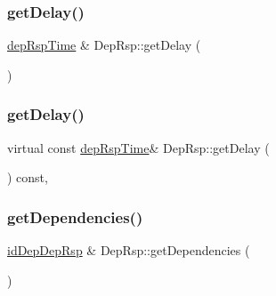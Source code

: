 \mbox{\label{classDepRsp_a89f0b26c269083713702386392f82c45}} 
\subsubsection{\texorpdfstring{get\+Delay()}{getDelay()}\hspace{0.1cm}{\footnotesize\ttfamily [1/2]}}
{\footnotesize\ttfamily \hyperlink{depRsp__m_8h_ab118b8474723cf26f98151aae3d55940}{dep\+Rsp\+Time} \& Dep\+Rsp\+::get\+Delay (\begin{DoxyParamCaption}{ }\end{DoxyParamCaption})\hspace{0.3cm}{\ttfamily [virtual]}}

\mbox{\label{classDepRsp_a8badf32e7f81c0ec7a9b4eb22fb83c0a}} 
\subsubsection{\texorpdfstring{get\+Delay()}{getDelay()}\hspace{0.1cm}{\footnotesize\ttfamily [2/2]}}
{\footnotesize\ttfamily virtual const \hyperlink{depRsp__m_8h_ab118b8474723cf26f98151aae3d55940}{dep\+Rsp\+Time}\& Dep\+Rsp\+::get\+Delay (\begin{DoxyParamCaption}{ }\end{DoxyParamCaption}) const\hspace{0.3cm}{\ttfamily [inline]}, {\ttfamily [virtual]}}

\mbox{\label{classDepRsp_a507c1f42135deca6079b31f5fe8da301}} 
\subsubsection{\texorpdfstring{get\+Dependencies()}{getDependencies()}\hspace{0.1cm}{\footnotesize\ttfamily [1/2]}}
{\footnotesize\ttfamily \hyperlink{depRsp__m_8h_a3c2ceb107008eb344443aaab2eb872b8}{id\+Dep\+Dep\+Rsp} \& Dep\+Rsp\+::get\+Dependencies (\begin{DoxyParamCaption}{ }\end{DoxyParamCaption})\hspace{0.3cm}{\ttfamily [virtual]}}

